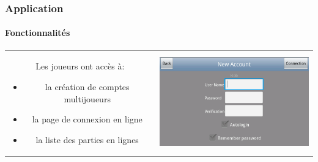 \begin{frame}
\frametitle{Application}
\framesubtitle{Fonctionnalités}

	\begin{center}
		\begin{tabular}{cc}
			\begin{minipage}{4cm}
				Les joueurs ont accès à:
				\begin{itemize}
				  \item la création de comptes multijoueurs
				  \item la page de connexion en ligne
				  \item la liste des parties en lignes
				\end{itemize}
				\end{minipage}&		
				
			\begin{minipage}{8cm}
				\includegraphics[width=7cm]{img/3.png} 
			\end{minipage}\\
			
			
			\end{tabular}
	\end{center}
	

\end{frame}

